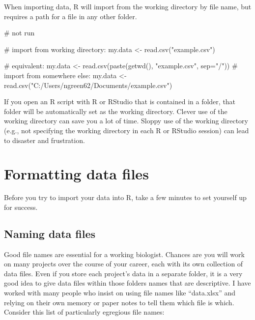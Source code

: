\documentclass[
  13,
  letterpaper,
]{report}
\newenvironment{Shaded}{\begin{snugshade}}{\end{snugshade}}
\newcommand{\AttributeTok}[1]{\textcolor[rgb]{0.40,0.45,0.13}{#1}}
\newcommand{\CommentTok}[1]{\textcolor[rgb]{0.37,0.37,0.37}{#1}}
\newcommand{\FunctionTok}[1]{\textcolor[rgb]{0.28,0.35,0.67}{#1}}
\newcommand{\NormalTok}[1]{\textcolor[rgb]{0.00,0.23,0.31}{#1}}
\newcommand{\OtherTok}[1]{\textcolor[rgb]{0.00,0.23,0.31}{#1}}
\newcommand{\StringTok}[1]{\textcolor[rgb]{0.13,0.47,0.30}{#1}}
\begin{document}
When importing data, R will import from the working directory by file
name, but requires a path for a file in any other folder.

\begin{Shaded}
\begin{Highlighting}[]
\CommentTok{\# not run}

\CommentTok{\# import from working directory:}
\NormalTok{my.data }\OtherTok{\textless{}{-}} \FunctionTok{read.csv}\NormalTok{(}\StringTok{"example.csv"}\NormalTok{)}

\CommentTok{\# equivalent: }
\NormalTok{my.data }\OtherTok{\textless{}{-}} \FunctionTok{read.csv}\NormalTok{(}\FunctionTok{paste}\NormalTok{(}\FunctionTok{getwd}\NormalTok{(), }\StringTok{"example.csv"}\NormalTok{, }\AttributeTok{sep=}\StringTok{"/"}\NormalTok{))}
\CommentTok{\# import from somewhere else:}
\NormalTok{my.data }\OtherTok{\textless{}{-}} \FunctionTok{read.csv}\NormalTok{(}\StringTok{"C:/Users/ngreen62/Documents/example.csv"}\NormalTok{)}
\end{Highlighting}
\end{Shaded}

If you open an R script with R or RStudio that is contained in a folder,
that folder will be automatically set as the working directory. Clever
use of the working directory can save you a lot of time. Sloppy use of
the working directory (e.g., not specifying the working directory in
each R or RStudio session) can lead to disaster and frustration.

\section{Formatting data files}\label{sec-ie-format}

Before you try to import your data into R, take a few minutes to set
yourself up for success.

\subsection{Naming data files}\label{sec-ie-format-name}

Good file names are essential for a working biologist. Chances are you
will work on many projects over the course of your career, each with its
own collection of data files. Even if you store each project's data in a
separate folder, it is a very good idea to give data files within those
folders names that are descriptive. I have worked with many people who
insist on using file names like ``data.xlsx'' and relying on their own
memory or paper notes to tell them which file is which. Consider this
list of particularly egregious file names:
\end{document}
